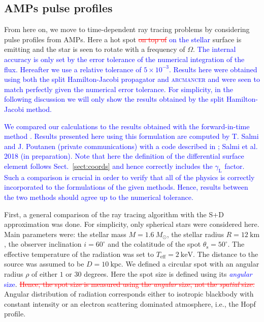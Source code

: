 \documentclass{aa}
\newcommand{\refe}[1]{\textcolor{blue}{{#1}}}
\newcommand{\refedel}[1]{\textcolor{red}{\sout{#1}}}
\newcommand{\Msun}{\ensuremath{M_{\odot}}}
\newcommand{\lgamma}{\gamma_{\text{L}}}
\begin{document}
\subsection{AMPs pulse profiles}\label{sect:AMPs}

From here on, we move to time-dependent ray tracing problems by considering pulse profiles from AMPs.
Here a hot spot \refedel{on top of} \refe{on the stellar} surface is emitting and the star is seen to rotate with a frequency of $\Omega$.
\refe{The internal accuracy is only set by the error tolerance of the numerical integration of the flux.
Hereafter we use a relative tolerance of $5 \times 10^{-3}$.
Results here were obtained using both the split Hamilton-Jacobi propagator and \textsc{arcmancer} and were seen to match perfectly given the numerical error tolerance.
For simplicity, in the following discussion we will only show the results obtained by the split Hamilton-Jacobi method.
}

\refe{
We compared our calculations to the results obtained with the forward-in-time method \citep[see e.g.,][]{PB06, MLCB07}.
Results presented here using this formulation are computed by T. Salmi and J. Poutanen (private communications) with a code described in \citet{PG04, PB06}; Salmi et al. 2018 (in preparation).
Note that here the definition of the differential surface element follows Sect.~\ref{sect:coords} and hence correctly includes the $\lgamma$ factor.
Such a comparison is crucial in order to verify that all of the physics is correctly incorporated to the formulations of the given methods.
Hence, results between the two methods should agree up to the numerical tolerance.
}

First, a general comparison of the ray tracing algorithm with the S+D approximation was done. 
For simplicity, only spherical stars were considered here.
Main parameters were: the stellar mass $M = 1.6~\Msun$, the stellar radius $R = 12~\mathrm{km}$, the observer inclination $i = 60^{\circ}$ and the colatitude of the spot $\theta_{\mathrm{s}} = 50^{\circ}$.  
The effective temperature of the radiation was set to $T_{\mathrm{eff}} = 2~\mathrm{keV}$.  
The distance to the source was assumed to be $D = 10~\mathrm{kpc}$.  
We defined a circular spot with an angular radius $\rho$ of either $1$ or $30$ degrees.
Here the spot size is defined using its \refe{\emph{angular} size}.
\refedel{Hence, the spot size is measured using the \textit{angular} size, not the \textit{spatial} size.}
Angular distribution of radiation corresponds either to isotropic blackbody with constant intensity or an electron scattering dominated atmosphere, i.e., the Hopf profile.
\end{document}
